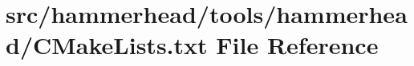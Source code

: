 \hypertarget{tools_2hammerhead_2CMakeLists_8txt}{}\section{src/hammerhead/tools/hammerhead/\+C\+Make\+Lists.txt File Reference}
\label{tools_2hammerhead_2CMakeLists_8txt}
